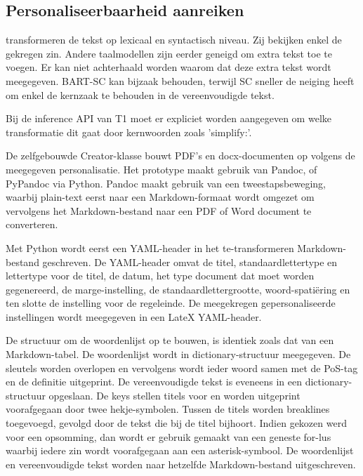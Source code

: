 \subsection{Personaliseerbaarheid aanreiken}


transformeren de tekst op lexicaal en syntactisch niveau. Zij bekijken enkel de gekregen zin. Andere taalmodellen zijn eerder geneigd om extra tekst toe te voegen. Er kan niet achterhaald worden waarom dat deze extra tekst wordt meegegeven. BART-SC kan bijzaak behouden, terwijl SC sneller de neiging heeft om enkel de kernzaak te behouden in de vereenvoudigde tekst. 

Bij de inference API van T1 moet er expliciet worden aangegeven om welke transformatie dit gaat door kernwoorden zoals 'simplify:'.

\medspace

De zelfgebouwde Creator-klasse bouwt PDF's en docx-documenten op volgens de meegegeven personalisatie. Het prototype maakt gebruik van Pandoc, of PyPandoc via Python. Pandoc maakt gebruik van een tweestapsbeweging, waarbij plain-text eerst naar een Markdown-formaat wordt omgezet om vervolgens het Markdown-bestand naar een PDF of Word document te converteren.

\medspace

Met Python wordt eerst een YAML-header in het te-transformeren Markdown-bestand geschreven. De YAML-header omvat de titel, standaardlettertype en lettertype voor de titel, de datum, het type document dat moet worden gegenereerd, de marge-instelling, de standaardlettergrootte, woord-spatiëring en ten slotte de instelling voor de regeleinde. De meegekregen gepersonaliseerde instellingen wordt meegegeven in een LateX YAML-header.

\medspace

De structuur om de woordenlijst op te bouwen, is identiek zoals dat van een Markdown-tabel. De  woordenlijst wordt in dictionary-structuur meegegeven. De sleutels worden overlopen en vervolgens wordt ieder woord samen met de PoS-tag en de definitie uitgeprint. De vereenvoudigde tekst is eveneens in een dictionary-structuur opgeslaan. De keys stellen titels voor en worden uitgeprint voorafgegaan door twee hekje-symbolen. Tussen de titels worden breaklines toegevoegd, gevolgd door de tekst die bij de titel bijhoort. Indien gekozen werd voor een opsomming, dan wordt er gebruik gemaakt van een geneste for-lus waarbij iedere zin wordt voorafgegaan aan een asterisk-symbool. De woordenlijst en vereenvoudigde tekst worden naar hetzelfde Markdown-bestand uitgeschreven. 

